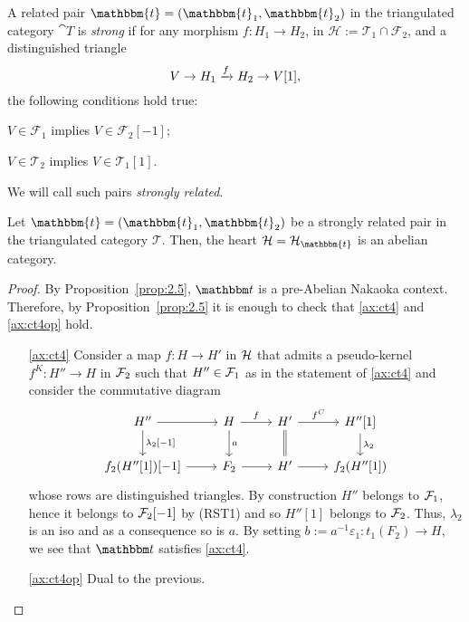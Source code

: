 \begin{definition}\label{def:strongly_related}
  A related pair $\mathbbm{t}=(\mathbbm{t}_1,\mathbbm{t}_2)$ in the triangulated category
  $\cat{T}$ is \emph{strong} if for any morphism $f:H_1\to H_2$, in $\mathcal{H}:=\mathcal{T}_1\cap\mathcal{F}_2$,
  and a distinguished triangle \[ V\to H_1\xrightarrow{f}H_2\to V[1],\] the following conditions
  hold true:
  \begin{relatedtorsion}
  \item\label{ax:rst1} $V\in\mathcal{F}_1$ implies $V\in\mathcal{F}_2[-1]$;
  \item\label{ax:rst2} $V\in\mathcal{T}_2$ implies $V\in\mathcal{T}_1[1]$.
  \end{relatedtorsion}

  We will call such pairs \emph{strongly related}.
\end{definition}

\begin{thm}\label{thm:2.6}
  Let $\mathbbm{t}=(\mathbbm{t}_1,\mathbbm{t}_2)$ be a strongly related pair in
  the triangulated category $\mathcal{T}$. Then, the heart $\mathcal{H}=\mathcal{H}_\mathbbm{t}$
  is an abelian category.
\end{thm}

\begin{proof}
  By Proposition~\ref{prop:2.5}, $\t$ is a pre-Abelian Nakaoka context. Therefore, by Proposition~\ref{prop:2.5} it is enough to check that \ref{ax:ct4} and \ref{ax:ct4op} hold.

  \begin{itemize}
    \item[\ref{ax:ct4}] Consider a map $f\colon H\to H'$ in $\mathcal{H}$ that admits a pseudo-kernel $f^K\colon H''\to H$ in $\mathcal{F}_2$ such that $H''\in\mathcal{F}_1$ as in the statement of \ref{ax:ct4} and consider the commutative diagram
      \begin{equation*}
        \begin{tikzcd}
          H''\arrow{r}\arrow{d}{\lambda_2[-1]}
          & H\arrow{r}{f}\arrow{d}{a}
          & H'\arrow{r}{f^C}\arrow[equal]{d}
          & H''[1]\arrow{d}{\lambda_2}\\
          f_2(H''[1])[-1]\arrow{r}
          & F_2\arrow{r}
          & H'\arrow{r}
          & f_2(H''[1])
        \end{tikzcd}
      \end{equation*}
      whose rows are distinguished triangles. By construction $H''$ belongs to $\mathcal{F}_1$, hence it belongs to $\mathcal{F}_2[-1]$ by (RST1) and so $H''[1]$ belongs to $\mathcal{F}_2$. Thus, $\lambda_2$ is an iso and as a consequence so is $a$. By setting $b:= a^{-1}\varepsilon_1\colon t_1(F_2)\to H$, we see that $\t$ satisfies \ref{ax:ct4}.
    \item[\ref{ax:ct4op}] Dual to the previous.
  \end{itemize}
\end{proof}

